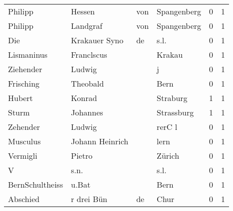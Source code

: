 \begin{tabular}{llllrr}
                  Philipp &                             Hessen &         von &                                 Spangenberg &          0 &         1 \\
                  Philipp &                           Landgraf &         von &                                 Spangenberg &          0 &         1 \\
                      Die &                      Krakauer Syno &          de &                                        s.l. &          0 &         1 \\
               Lismaninus &                         Franclscus &             &                                      Krakau &          0 &         1 \\
                Ziehender &                             Ludwig &             &                                           j &          0 &         1 \\
                Frisching &                           Theobald &             &                                        Bern &          0 &         1 \\
                   Hubert &                             Konrad &             &                                    Straburg &          1 &         1 \\
                    Sturm &                           Johannes &             &                                  Strassburg &          1 &         1 \\
                 Zehender &                             Ludwig &             &                                      rerC l &          0 &         1 \\
                 Musculus &                    Johann Heinrich &             &                                        lern &          0 &         1 \\
                 Vermigli &                             Pietro &             &                                      Zürich &          0 &         1 \\
                        V &                               s.n. &             &                                        s.l. &          0 &         1 \\
          BernSchultheiss &                              u.Bat &             &                                        Bern &          0 &         1 \\
                 Abschied &                         r drei Bün &          de &                                        Chur &          0 &         1 \\

\end{tabular}
